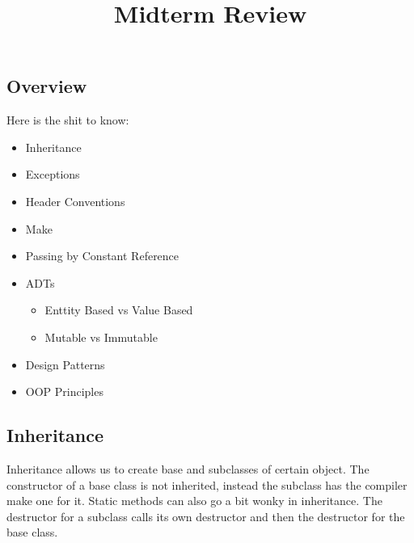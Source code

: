 \documentclass[12pt]{article}
\title{Midterm Review}
\begin{document}
\maketitle

\subsection*{Overview}
Here is the shit to know:
\begin{itemize}
  \item Inheritance
  \item Exceptions
  \item Header Conventions
  \item Make
  \item Passing by Constant Reference
  \item ADTs
  \begin{itemize}
    \item Enttity Based vs Value Based
    \item Mutable vs Immutable
  \end{itemize}
  \item Design Patterns
  \item OOP Principles
\end{itemize}

\subsection*{Inheritance}
Inheritance allows us to create base and subclasses of certain object. The constructor of a base class is not inherited, instead the subclass has the compiler make one for it. Static methods can also go a bit wonky in inheritance. The destructor for a subclass calls its own destructor and then the destructor for the base class.
\end{document}
